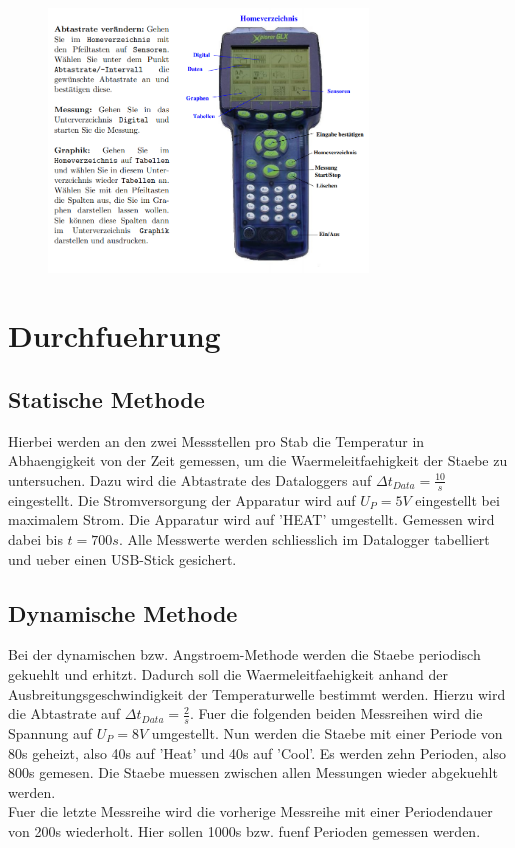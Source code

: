 \begin{figure}[H]
    \centering
    \captionsetup{justification=centering}
    \includegraphics[height=7cm]{"Logger_Waermeleitung.png"}
    \label{Fig:Logger}
\end{figure}
\section{Durchfuehrung}
\subsection{Statische Methode}
Hierbei werden an den zwei Messstellen pro Stab die Temperatur in Abhaengigkeit von der Zeit gemessen, um die Waermeleitfaehigkeit der Staebe zu untersuchen. Dazu wird die Abtastrate des Dataloggers auf $\Delta t_{Data} = \frac{10}{s}$ eingestellt. Die Stromversorgung der Apparatur wird auf $U_P= 5V$ eingestellt bei maximalem Strom. Die Apparatur wird auf 'HEAT' umgestellt. Gemessen wird dabei bis $t=700s$. Alle Messwerte werden schliesslich im Datalogger tabelliert und ueber einen USB-Stick gesichert.
\subsection{Dynamische Methode}
Bei der dynamischen bzw. Angstroem-Methode werden die Staebe periodisch gekuehlt und erhitzt. Dadurch soll die Waermeleitfaehigkeit anhand der Ausbreitungsgeschwindigkeit der Temperaturwelle bestimmt werden. Hierzu wird die Abtastrate auf $\Delta t_{Data}=\frac{2}{s}$. Fuer die folgenden beiden Messreihen wird die Spannung auf $U_P=8V$ umgestellt. Nun werden die Staebe mit einer Periode von 80s geheizt, also 40s auf 'Heat' und 40s auf 'Cool'. Es werden zehn Perioden, also 800s gemesen. Die Staebe muessen zwischen allen Messungen wieder abgekuehlt werden.\\
Fuer die letzte Messreihe wird die vorherige Messreihe mit einer Periodendauer von 200s wiederholt. Hier sollen 1000s bzw. fuenf Perioden gemessen werden.
